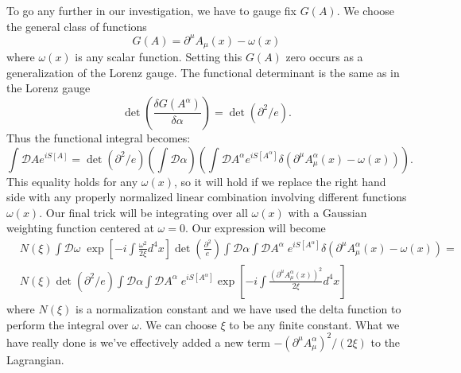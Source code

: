 To go any further in our investigation, we have to gauge fix
$G(A)$. We choose the general class of functions
\begin{equation}%
G(A) = \partial^{\mu}A_{\mu}(x) - \omega(x)
\end{equation}
where $\omega(x)$ is any scalar function. Setting this $G(A)$
zero occurs as a generalization of the Lorenz gauge. The
functional determinant is the same as in the Lorenz gauge
\begin{equation}%
\det\left(\frac{\delta G(A^{\alpha})}{\delta\alpha}\right)=\det(\partial^{2}/e).
\end{equation}
Thus the functional integral becomes:
\begin{equation}%
\int\mathcal{D}A e^{iS[A]} =
\det(\partial^{2}/e)\left(\int\mathcal{D}\alpha\right)\left(\int
\mathcal{D}A^{\alpha} e^{iS[A^{\alpha}]}\delta\left(\partial^{\mu}A^{\alpha}_{\mu}(x)-\omega(x)\right)\right).
\end{equation}
This equality holds for any $\omega(x)$, so it will hold if we
replace the right hand side with any properly normalized linear
combination involving different functions $\omega(x)$. Our final
trick will be integrating over all $\omega(x)$ with a Gaussian
weighting function centered at $\omega=0$. Our expression will
become
\begin{equation*}%
\begin{split}
&N(\xi)\int\mathcal{D}\omega\;
\exp\left[-i\int\frac{\omega^{2}}{2\xi}d^{4}x\right]\det(\frac{\partial^{2}}{e})\int\mathcal{D}\alpha\int\mathcal{D}A^{\alpha}\;e^{iS[A^{\alpha}]}\delta(\partial^{\mu}A_{\mu}^{\alpha}(x)-\omega(x))
=\\
&N(\xi)\det(\partial^{2}/e)\int\mathcal{D}\alpha\int\mathcal{D}A^{\alpha}\;e^{iS[A^{\alpha}]}\exp\left[-i\int\frac{(\partial^{\mu}A^{\alpha}_{\mu}(x))^{2}}{2\xi}d^{4}x\right]
\end{split}
\end{equation*}
where $N(\xi)$ is a normalization constant and we have used the
delta function to perform the integral over $\omega$. We can
choose $\xi$ to be any finite constant. What we have really done
is we've effectively added a new term
$-(\partial^{\mu}A_{\mu}^{\alpha})^{2}/(2\xi)$ to the Lagrangian.

